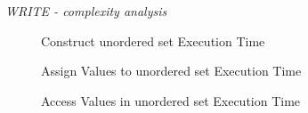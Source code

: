 \textit{WRITE - complexity analysis}

\begin{figure}[p]
\caption{Construct unordered set Execution Time}
\label{fig:unset-cont-constr-exper}
\end{figure}

\begin{figure}[p]
\caption{Assign Values to unordered set Execution Time}
\label{fig:unset-cont-assign-exper}
\end{figure}

\begin{figure}[p]
\caption{Access Values in unordered set Execution Time}
\label{fig:unset-cont-access-exper}
\end{figure}

